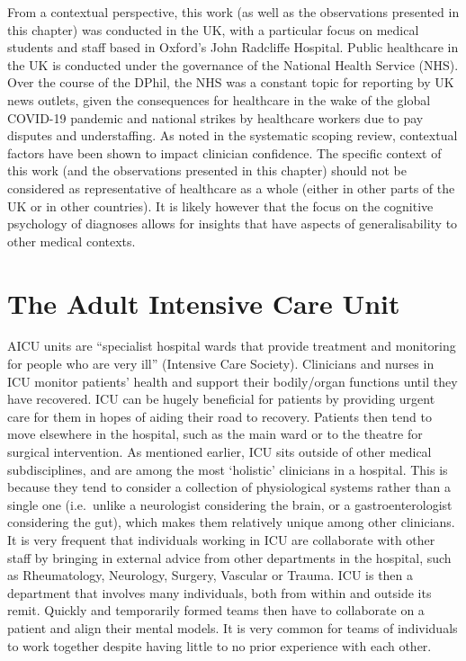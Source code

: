 \documentclass[a4paper, nobind]{templates/ociamthesis}
\begin{document}
\hfill\break
From a contextual perspective, this work (as well as the observations presented in this chapter) was conducted in the UK, with a particular focus on medical students and staff based in Oxford's John Radcliffe Hospital. Public healthcare in the UK is conducted under the governance of the National Health Service (NHS). Over the course of the DPhil, the NHS was a constant topic for reporting by UK news outlets, given the consequences for healthcare in the wake of the global COVID-19 pandemic and national strikes by healthcare workers due to pay disputes and understaffing. As noted in the systematic scoping review, contextual factors have been shown to impact clinician confidence. The specific context of this work (and the observations presented in this chapter) should not be considered as representative of healthcare as a whole (either in other parts of the UK or in other countries). It is likely however that the focus on the cognitive psychology of diagnoses allows for insights that have aspects of generalisability to other medical contexts.

\section*{The Adult Intensive Care Unit}\label{the-adult-intensive-care-unit}

AICU units are ``specialist hospital wards that provide treatment and monitoring for people who are very ill'' (Intensive Care Society). Clinicians and nurses in ICU monitor patients' health and support their bodily/organ functions until they have recovered. ICU can be hugely beneficial for patients by providing urgent care for them in hopes of aiding their road to recovery. Patients then tend to move elsewhere in the hospital, such as the main ward or to the theatre for surgical intervention. As mentioned earlier, ICU sits outside of other medical subdisciplines, and are among the most `holistic' clinicians in a hospital. This is because they tend to consider a collection of physiological systems rather than a single one (i.e.~unlike a neurologist considering the brain, or a gastroenterologist considering the gut), which makes them relatively unique among other clinicians. It is very frequent that individuals working in ICU are collaborate with other staff by bringing in external advice from other departments in the hospital, such as Rheumatology, Neurology, Surgery, Vascular or Trauma. ICU is then a department that involves many individuals, both from within and outside its remit. Quickly and temporarily formed teams then have to collaborate on a patient and align their mental models. It is very common for teams of individuals to work together despite having little to no prior experience with each other.
\end{document}
